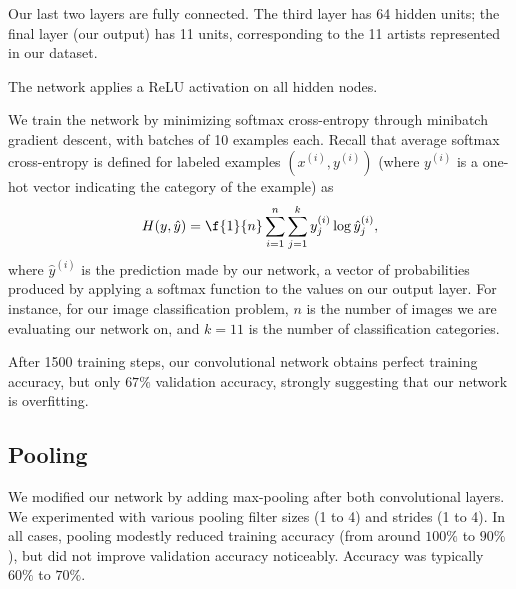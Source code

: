 \documentclass{article}
\newcommand{\sind}[1]{^{(#1)}}
\begin{document}
\begin{multicols}{2}
Our last two layers are fully connected.
The third layer has 64 hidden units;
the final layer (our output) has 11 units,
corresponding to the 11 artists represented in our dataset.

The network applies a ReLU activation on all hidden nodes.

We train the network by minimizing softmax cross-entropy
through minibatch gradient descent,
with batches of 10 examples each.
Recall that average softmax cross-entropy is defined
for labeled examples $(x\sind{i}, y\sind{i})$
(where $y\sind{i}$ is a one-hot vector indicating the category of the example)
as
\begin{equation}
    H(y, \hat y) = \f{1}{n}\sum_{i=1}^n
                             \sum_{j=1}^k
                               y\sind{i}_j \log \hat y\sind{i}_j,
\end{equation}
where $\hat y\sind{i}$ is the prediction made by our network,
a vector of probabilities
produced by applying a softmax function
to the values on our output layer.
For instance, for our image classification problem,
$n$ is the number of images we are evaluating our network on,
and $k=11$ is the number of classification categories.

After 1500 training steps,
our convolutional network obtains perfect training accuracy,
but only $67\%$ validation accuracy,
strongly suggesting that our network is overfitting.

\subsection{Pooling}

We modified our network by adding max-pooling
after both convolutional layers.
We experimented with various pooling filter sizes (1 to 4)
and strides (1 to 4).
In all cases,
pooling modestly reduced training accuracy
(from around $100\%$ to $90\%$),
but did not improve validation accuracy noticeably.
Accuracy was typically $60\%$ to $70\%$.


\end{multicols}
\end{document}
